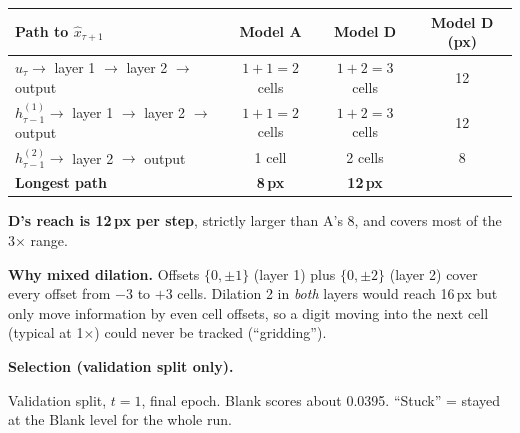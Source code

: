 \documentclass[11pt, a4paper]{article}
\begin{document}
\begin{center}
\begin{tabular}{lccc}
\toprule
Path to $\hat{x}_{\tau+1}$ & Model A & Model D & Model D (px) \\
\midrule
$u_\tau \to$ layer 1 $\to$ layer 2 $\to$ output & $1 + 1 = 2$ cells & $1 + 2 = 3$ cells & 12 \\
$h^{(1)}_{\tau-1} \to$ layer 1 $\to$ layer 2 $\to$ output & $1 + 1 = 2$ cells & $1 + 2 = 3$ cells & 12 \\
$h^{(2)}_{\tau-1} \to$ layer 2 $\to$ output & 1 cell & 2 cells & 8 \\
\midrule
\textbf{Longest path} & \textbf{8\,px} & \textbf{12\,px} & \\
\bottomrule
\end{tabular}
\end{center}

\textbf{D's reach is 12\,px per step}, strictly larger than A's 8, and covers most of the 3$\times$ range.

\textbf{Why mixed dilation.} Offsets $\{0,\pm1\}$ (layer 1) plus $\{0,\pm2\}$ (layer 2) cover every offset from $-3$ to $+3$ cells. Dilation 2 in \emph{both} layers would reach 16\,px but only move information by even cell offsets, so a digit moving into the next cell (typical at 1$\times$) could never be tracked (``gridding'').

\textbf{Selection (validation split only).}

\begin{center}

\smallskip
{\small Validation split, $t=1$, final epoch. Blank scores about 0.0395. ``Stuck'' = stayed at the Blank level for the whole run.}
\end{center}
\end{document}
